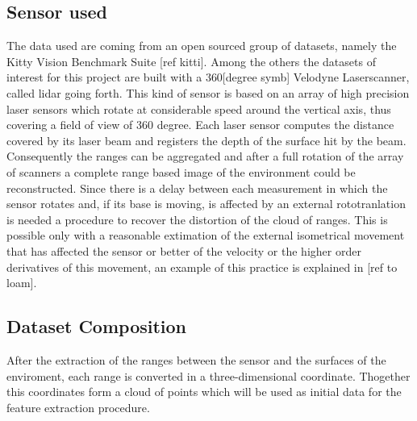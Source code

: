 \documentclass[LaM,binding=0.6cm]{sapthesis}
\begin{document}
\subsection{Sensor used}
The data used are coming from an open sourced group of datasets, namely the Kitty Vision Benchmark Suite [ref kitti]. Among the others the datasets of interest for this project are built with a 360[degree symb] Velodyne Laserscanner, called lidar going forth. This kind of sensor is based on an array of high precision laser sensors which rotate at considerable speed around the vertical axis, thus covering a field of view of 360 degree. Each laser sensor computes the distance covered by its laser beam and registers the depth of the surface hit by the beam.
Consequently the ranges can be aggregated and after a full rotation of the array of scanners a complete range based image of the environment could be reconstructed. Since there is a delay between each measurement in which the sensor rotates and, if its base is moving, is affected by an external rototranlation is needed a procedure to recover the distortion of the cloud of ranges. This is possible only with a reasonable extimation of the external isometrical movement that has affected the sensor or better of the velocity or the higher order derivatives of this movement, an example of this practice is explained in [ref to loam].

\subsection{Dataset Composition}
After the extraction of the ranges between the sensor and the surfaces of the enviroment, each range is converted in a three-dimensional coordinate.
Thogether this coordinates form a cloud of points which will be used as initial data for the feature extraction procedure.
\end{document}
